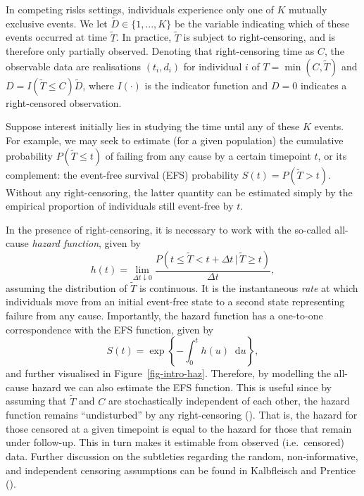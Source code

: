 \documentclass[
  letterpaper,
  DIV=11,
  numbers=noendperiod]{scrreprt}
\newcommand{\given}{\,|\,}
\newcommand\diff{\mathop{}\!\mathrm{d}}
\begin{document}
In competing risks settings, individuals experience only one of \(K\)
mutually exclusive events. We let \(\tilde{D} \in \{1,...,K\}\) be the
variable indicating which of these events occurred at time
\(\tilde{T}\). In practice, \(\tilde{T}\) is subject to right-censoring,
and is therefore only partially observed. Denoting that right-censoring
time as \(C\), the observable data are realisations \((t_i, d_i)\) for
individual \(i\) of \(T = \min(C,\tilde{T})\) and
\(D = I(\tilde{T} \leq C)\tilde{D}\), where \(I(\cdot)\) is the
indicator function and \(D = 0\) indicates a right-censored observation.

Suppose interest initially lies in studying the time until any of these
\(K\) events. For example, we may seek to estimate (for a given
population) the cumulative probability \(P(\tilde{T} \leq t)\) of
failing from any cause by a certain timepoint \(t\), or its complement:
the event-free survival (EFS) probability \(S(t) = P(\tilde{T} > t)\).
Without any right-censoring, the latter quantity can be estimated simply
by the empirical proportion of individuals still event-free by \(t\).

In the presence of right-censoring, it is necessary to work with the
so-called all-cause \emph{hazard function}, given by \[
    h(t) = \lim_{\Delta t \downarrow 0} \frac{P(t \leq \tilde{T} < t + \Delta t\given \tilde{T} \geq t)}{\Delta t},
\] assuming the distribution of \(\tilde{T}\) is continuous. It is the
instantaneous \emph{rate} at which individuals move from an initial
event-free state to a second state representing failure from any cause.
Importantly, the hazard function has a one-to-one correspondence with
the EFS function, given by \[
  S(t) = \exp \left\{ - \int_{0}^{t} h(u)\diff u \right\},
\] and further visualised in Figure~\ref{fig-intro-haz}. Therefore, by
modelling the all-cause hazard we can also estimate the EFS function.
This is useful since by assuming that \(\tilde{T}\) and \(C\) are
stochastically independent of each other, the hazard function remains
``undisturbed'' by any right-censoring
(). That is, the hazard for those censored at a given
timepoint is equal to the hazard for those that remain under follow-up.
This in turn makes it estimable from observed (i.e.~censored) data.
Further discussion on the subtleties regarding the random,
non-informative, and independent censoring assumptions can be found in
Kalbfleisch and Prentice
().
\end{document}
